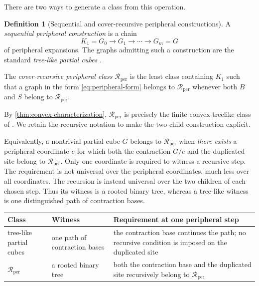 \documentclass[11pt]{article}
\theoremstyle{definition}
\newtheorem{definition}[theorem]{Definition}
\theoremstyle{remark}
\newcommand{\Rper}{\mathcal R_{\mathrm{per}}}
\begin{document}
There are two ways to generate a class from this operation.
\begin{definition}[Sequential and cover-recursive peripheral constructions]
\label{def:sequential-recursive}
A \emph{sequential peripheral construction} is a chain
\[
 K_1=G_0\longrightarrow G_1\longrightarrow\cdots\longrightarrow G_m=G
\]
of peripheral expansions.  The graphs admitting such a construction are the
standard \emph{tree-like partial cubes} \cite{BresarImrichKlavzar03}.

The \emph{cover-recursive peripheral class} \(\Rper\) is the least class
containing \(K_1\) such that a graph in the form
\eqref{eq:peripheral-form} belongs to \(\Rper\) whenever both \(B\) and \(S\)
belong to \(\Rper\).
\end{definition}

By \cref{thm:convex-characterization}, \(\Rper\) is precisely the finite
convex-treelike class of \cite[Definition~5.5]{Polat12treelike}. We retain
the recursive notation to make the two-child construction explicit.

Equivalently, a nontrivial partial cube \(G\) belongs to \(\Rper\) when
\emph{there exists} a peripheral coordinate \(e\) for which both the
contraction \(G/e\) and the duplicated site belong to \(\Rper\).  Only one
coordinate is required to witness a recursive step.  The requirement is not
universal over the peripheral coordinates, much less over all coordinates.
The recursion is instead universal over the two children of each chosen
step.  Thus its witness is a rooted binary tree, whereas a tree-like witness
is one distinguished path of contraction bases.

\begin{center}
\small
\begin{tabular}{@{}p{}p{}p{}@{}}
\toprule
Class & Witness & Requirement at one peripheral step\\
\midrule
tree-like partial cubes
  & one path of contraction bases
  & the contraction base continues the path; no recursive condition is
    imposed on the duplicated site\\
\(\Rper\)
  & a rooted binary tree
  & both the contraction base and the duplicated site recursively belong
    to \(\Rper\)\\
\bottomrule
\end{tabular}
\end{center}
\end{document}
